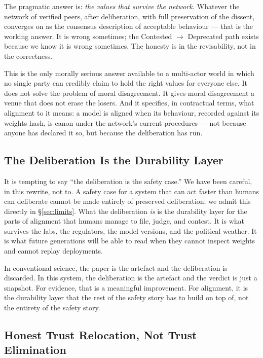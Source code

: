 \documentclass[11pt,a4paper]{article}
\begin{document}
The pragmatic answer is: \emph{the values that survive the
network.} Whatever the network of verified peers, after
deliberation, with full preservation of the dissent, converges
on as the consensus description of acceptable behaviour --- that
is the working answer. It is wrong sometimes; the Contested
$\to$ Deprecated path exists because we know it is wrong
sometimes. The honesty is in the revisability, not in the
correctness.

This is the only morally serious answer available to a
multi-actor world in which no single party can credibly claim
to hold the right values for everyone else. It does not solve
the problem of moral disagreement. It gives moral disagreement a
venue that does not erase the losers. And it specifies, in
contractual terms, what alignment to it means: a model is aligned
when its behaviour, recorded against its weights hash, is canon
under the network's current procedures --- not because anyone has
declared it so, but because the deliberation has run.

\subsection{The Deliberation Is the Durability Layer}

It is tempting to say ``the deliberation is the safety case.'' We
have been careful, in this rewrite, not to. A safety case for a
system that can act faster than humans can deliberate cannot be
made entirely of preserved deliberation; we admit this directly
in \S\ref{sec:limits}. What the deliberation \emph{is} is the
durability layer for the parts of alignment that humans manage to
file, judge, and contest. It is what survives the labs, the
regulators, the model versions, and the political weather. It is
what future generations will be able to read when they cannot
inspect weights and cannot replay deployments.

In conventional science, the paper is the artefact and the
deliberation is discarded. In this system, the deliberation is
the artefact and the verdict is just a snapshot. For evidence,
that is a meaningful improvement. For alignment, it is the
durability layer that the rest of the safety story has to
build on top of, not the entirety of the safety story.

\subsection{Honest Trust Relocation, Not Trust Elimination}
\end{document}
